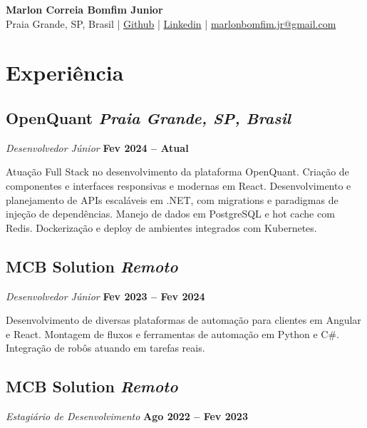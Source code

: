 \documentclass[a4paper,10pt]{article}
\newcommand{\company}[1]{{\bfseries #1}}
\newcommand{\place}[1]{{\itshape #1}}
\newcommand{\role}[1]{{\itshape\color{muted}#1}}
\newcommand{\daterange}[1]{{\small\bfseries\color{muted}#1}}
\begin{document}
\begin{flushleft}
    {\LARGE \textbf{Marlon Correia Bomfim Junior}} 
    \\ [0.1cm]
    Praia Grande, SP, Brasil
    \quad | \quad
    {\ttfamily \href{https://github.com/marlaoza}{Github}
    \quad | \quad
    \href{https://www.linkedin.com/in/marlon-correia-bomfim-junior-36a1a9230}{Linkedin} 
    \quad | \quad
    \href{mailto:marlonbomfim.jr@gmail.com}{marlonbomfim.jr@gmail.com} 
    }
\end{flushleft}


\section{Experiência}
    \subsection*{\texorpdfstring{
      \company{OpenQuant}
      \hfill
      \place{Praia Grande, SP, Brasil}
    }{
      OpenQuant -- Praia Grande, SP, Brasil
    }}
    \par
    \role{Desenvolvedor Júnior}
    \hfill
    \daterange{Fev 2024 -- Atual}
        
    Atuação Full Stack no desenvolvimento da plataforma OpenQuant.  
    Criação de componentes e interfaces responsivas e modernas em React.  
    Desenvolvimento e planejamento de APIs escaláveis em .NET, com migrations e paradigmas de injeção de dependências.  
    Manejo de dados em PostgreSQL e hot cache com Redis.  
    Dockerização e deploy de ambientes integrados com Kubernetes.


    \subsection*{\texorpdfstring{
      \company{MCB Solution}
      \hfill
      \place{Remoto}
    }{
      MCB Solution -- Remoto
    }}
    \par
    \role{Desenvolvedor Júnior}
    \hfill
    \daterange{Fev 2023 -- Fev 2024}
        
   Desenvolvimento de diversas plataformas de automação para clientes em Angular e React. Montagem de fluxos e ferramentas de automação em Python e C\#. Integração de robôs atuando em tarefas reais.

    \subsection*{\texorpdfstring{
      \company{MCB Solution}
      \hfill
      \place{Remoto}
    }{
      MCB Solution -- Remoto
    }}
    \par
    \role{Estagiário de Desenvolvimento}
    \hfill
    \daterange{Ago 2022 -- Fev 2023}
        
\end{document}
